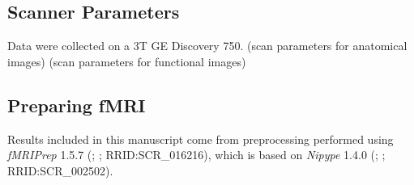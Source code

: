 \documentclass[10pt,letterpaper]{article}
\begin{document}
\subsection{Scanner Parameters}
Data were collected on a 3T GE Discovery 750.
(scan parameters for anatomical images)
(scan parameters for functional images)



\subsection{Preparing fMRI}
Results included in this manuscript come from preprocessing performed
using \emph{fMRIPrep} 1.5.7 (\cite{fmriprep1}; \cite{fmriprep2}; RRID:SCR\_016216),
which is based on \emph{Nipype} 1.4.0
(\cite{nipype1}; \cite{nipype2}; RRID:SCR\_002502).
\end{document}
